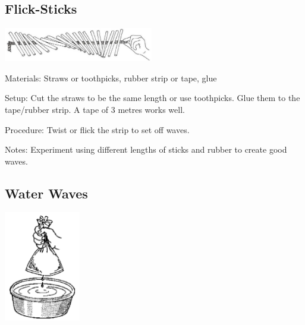 \begin{multicols}{2}
\subsection{Flick-Sticks}

\begin{center}
\includegraphics[width=0.49\textwidth]{./img/vso/flick-sticks.jpg}
\end{center}

\begin{description*}
\item[Materials:]{Straws or toothpicks, rubber strip or tape, glue}
\item[Setup:]{Cut the straws to be the same length or use toothpicks. Glue them to the tape/rubber strip. A tape of 3 metres works well.}
\item[Procedure:]{Twist or flick the strip to set off waves.}
\item[Notes:]{Experiment using different lengths of sticks and rubber to create good waves.}
\end{description*}

\subsection{Water Waves}

\begin{center}
\includegraphics[width=0.25\textwidth]{./img/source/water-waves.png}
\end{center}


\end{multicols}
